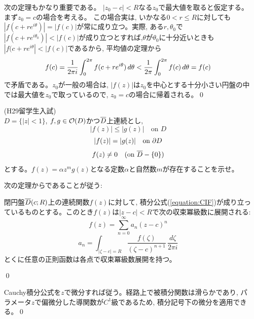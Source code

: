 次の定理もかなり重要である。
\prf $|z_0-c|<R$なる$z_0$で最大値を取ると仮定する。まず$z_0=c$の場合を考える。 この場合実は, いかなる$0<r\leq R$に対しても$|f(c+re^{i\theta})| = |f(c)|$が常に成り立つ。実際, ある$r,\theta_0$で$|f(c+re^{i\theta_0})| < |f(c)|$が成り立つとすれば,$\theta$が$\theta_0$に十分近いときも$|f(c+re^{i\theta}| < |f(c)|$であるから, 平均値の定理から
\[f(c)=\dfrac{1}{2\pi i} \displaystyle\int_{0}^{2\pi} f(c+re^{i\theta})\, d\theta < \dfrac{1}{2\pi}\displaystyle\int_{0}^{2\pi} f(c)\, d\theta = f(c)\]
で矛盾である。$z_0$が一般の場合は, $|f(z)|$は$z_0$を中心とする十分小さい円盤の中では最大値を$z_0$で取っているので, $z_0=c$の場合に帰着される。\qed

\begin{egprob} (H29留学生入試)\\
$D=\{ |z|<1\}$, $f,g\in \mathcal{O}(D)$かつ$\overline{D}$上連続とし,
\[|f(z)|\leq |g(z)| \quad \text{on $D$}\]
\[|f(z)| = |g(z)|\quad \text{on $\partial D$}\]
\[f(z) \neq 0\quad (\text{on  $\overline{D} - \{ 0 \}$})\]
とする。$f(z) = \alpha z^m g(z)$となる定数$\alpha$と自然数$m$が存在することを示せ。
\end{egprob}


次の定理からであることが従う:
\begin{theo}
閉円盤$\overline{D}(c;R)$上の連続関数$f(z)$に対して, 積分公式(\ref{equation:CIF})が成り立っているものとする。このとき$f(z)$は$|z-c|<R$で次の収束冪級数に展開される:
\[f(z) = \sum_{n=0}^{\infty} a_n(z-c)^{n}\]
\[a_n = \int_{|\zeta - c| = R} \dfrac{f(\zeta)}{(\zeta-c)^{n+1}}\, \dfrac{d\zeta}{2\pi i}\]
とくに任意の正則函数は各点で収束冪級数展開を持つ。\bbox
\end{theo}
\prf
\qed

\prf Cauchy積分公式を$z$で微分すれば従う。経路上で被積分関数は滑らかであり, パラメータ$z$で偏微分した導関数が$C^1$級であるため, 積分記号下の微分を適用できる。\qed

